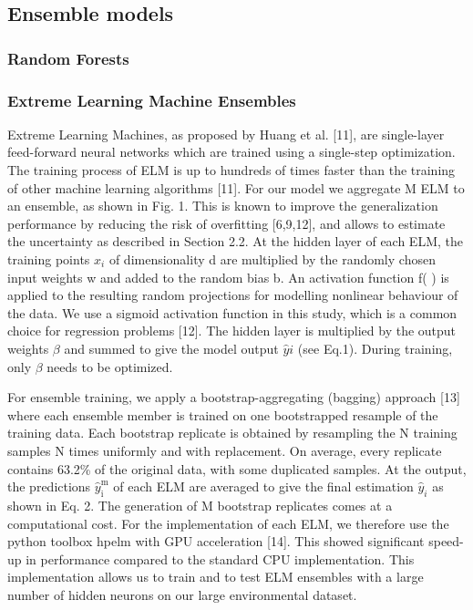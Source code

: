 \subsection{Ensemble models}
\subsubsection*{Random Forests}
\subsubsection*{Extreme Learning Machine Ensembles}
Extreme Learning Machines, as proposed by Huang et al. [11], are single-layer feed-forward neural networks which are trained using a single-step optimization. The training process of ELM is up to hundreds of times faster than the training of other machine learning algorithms [11]. For our model we aggregate M ELM to an ensemble, as shown in Fig. 1. This is known to improve the generalization performance by reducing the risk of overfitting [6,9,12], and allows to estimate the uncertainty as described in Section 2.2. At the hidden layer of each ELM, the training points $x_i$ of dimensionality d are multiplied by the randomly chosen input weights w and added to the random bias b. An activation function ƒ( ) is applied to the resulting random projections for modelling nonlinear behaviour of the data. We use a sigmoid activation function in this study, which is a common choice for regression problems [12]. The hidden layer is multiplied by the output weights $\beta$ and summed to give the model output $\hat{y}i$ (see Eq.1). During training, only $\beta$ needs to be optimized.

For ensemble training, we apply a bootstrap-aggregating (bagging) approach [13] where each ensemble member is trained on one bootstrapped resample of the training data. Each bootstrap replicate is obtained by resampling the N training samples N times uniformly and with replacement. On average, every replicate contains 63.2\% of the original data, with some duplicated samples. At the output, the predictions $\hat{y}_\mathrm{i}^\mathrm{m}$ of each ELM are averaged to give the final estimation $\hat{y}_i$ as shown in Eq. 2. The generation of M bootstrap replicates comes at a computational cost. For the implementation of each ELM, we therefore use the python toolbox hpelm with GPU acceleration [14]. This showed significant speed-up in performance compared to the standard CPU implementation. This implementation allows us to train and to test ELM ensembles with a large number of hidden neurons on our large environmental dataset.

